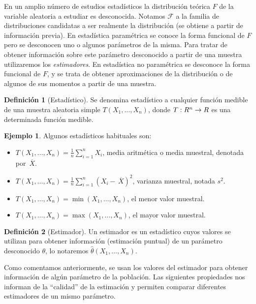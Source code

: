 \documentclass[12pt,a4paper]{report} %
\let\mathbb\relax
\newcommand{\olsi}[1]{\,\overline{\!{#1}}} %
\theoremstyle{definition}
\newtheorem{definition}{Definición}[section]
\newtheorem{example}[theorem]{Ejemplo}
\begin{document}
En un amplio número de estudios estadísticos la distribución teórica $F$ de la variable aleatoria a estudiar es desconocida. Notamos $\mathcal{F}$ a la familia de distribuciones candidatas a ser realmente la distribución (se obtiene a partir de información previa). En estadística paramétrica se conoce la forma funcional de $F$ pero se desconocen uno o algunos parámetros de la misma. Para tratar de obtener información sobre este parámetro desconocido a partir de una muestra utilizaremos los \textit{estimadores}. En estadística no paramétrica se desconoce la forma funcional de $F$, y se trata de obtener aproximaciones de la distribución o de algunos de sus momentos a partir de una muestra.\\

\begin{definition}[Estadístico]
  Se denomina estadístico a cualquier función medible de una muestra aleatoria simple $T(X_1,\dots,X_n)$, donde $T:\mathbb{R}^n\to \mathbb{R}$ es una determinada función medible.\\
\end{definition}

\begin{example}
  Algunos estadísticos habituales son:

  \begin{itemize}
  \item $T(X_1,\dots,X_n) = \frac{1}{n}\sum_{i=1}^nX_i$, media aritmética o media muestral, denotada por $\olsi{X}$.
  \item $T(X_1,\dots,X_n) = \frac{1}{n}\sum_{i=1}^n\left(X_i-\olsi{X} \right)^2$, varianza muestral, notada $s^2$.
  \item $T(X_1,\dots,X_n) = \min (X_1,\dots,X_n)$, el menor valor muestral.
  \item $T(X_1,\dots,X_n) = \max (X_1,\dots,X_n)$, el mayor valor muestral.\\
  \end{itemize}
\end{example}

\begin{definition}[Estimador]
Un estimador es un estadístico cuyos valores se utilizan para obtener información (estimación puntual) de un parámetro desconocido $\theta$, lo notaremos  $\widehat{\theta}(X_1, \dots, X_n)$.\\
\end{definition}

Como comentamos anteriormente, se usan los valores del estimador para obtener información de algún parámetro de la población. Las siguientes propiedades nos informan de la ``calidad'' de la estimación y permiten comparar diferentes estimadores de un mismo parámetro.\\
\end{document}
